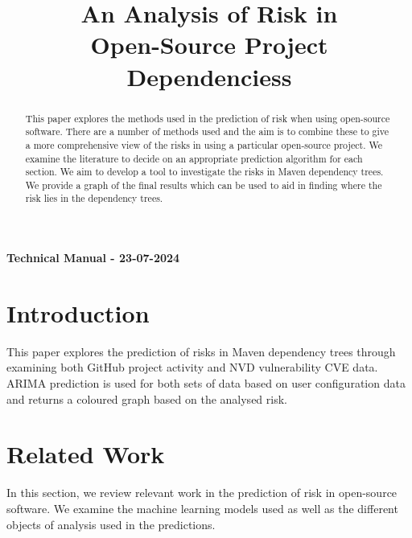 \documentclass[10pt, onecolumn, compsoc, conference]{IEEEtran}
\begin{document}
\title{An Analysis of Risk in \\Open-Source Project Dependenciess}

\author{
\and
{}
    }

\maketitle

\begin{description}
    \item[]
    \begin{center}
        \item[\textbf{Technical Manual - 23-07-2024}] 
        \end{center}
    \item[]
\end{description}



\begin{abstract}
\begin{addmargin}[4.2em]{4.2em}
This paper explores the methods used in the prediction of risk when using open-source software. There are a number of methods used and the aim is to combine these to give a more comprehensive view of the risks in using a particular open-source project. We examine the literature to decide on an appropriate prediction algorithm for each section. We aim to develop a tool to investigate the risks in Maven dependency trees. We provide a graph of the final results which can be used to aid in finding where the risk lies in the dependency trees. 
\end{addmargin}
\end{abstract}


\section{Introduction}
This paper explores the prediction of risks in Maven dependency trees through examining both GitHub project activity and NVD vulnerability CVE data. ARIMA prediction is used for both sets of data based on user configuration data and returns a coloured graph based on the analysed risk. 

\section{Related Work}
In this section, we review relevant work in the prediction of risk in open-source software. We examine the machine learning models used as well as the different objects of analysis used in the predictions.  
\end{document}
